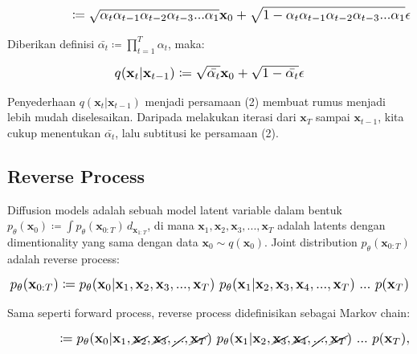 \documentclass{article}
\newcommand*{\Scale}[2][4]{\scalebox{#1}{\ensuremath{#2}}}
\begin{document}
\begin{equation}
\Scale[1.2]{ \displaystyle
\hspace{4.75em} \coloneq \sqrt{\alpha_t \alpha_{t-1} \alpha_{t-2} \alpha_{t-3} ... \alpha_{1}} \textbf{x}_{0} + \sqrt{1-\alpha_t\alpha_{t-1}\alpha_{t-2}\alpha_{t-3}...\alpha_{1}} \epsilon }
\end{equation}

Diberikan definisi $ \bar{\alpha_t} \coloneq \displaystyle \prod_{t=1}^{T} \alpha_t $, maka:

\begin{equation}
\Scale[1.2]{ \displaystyle
q(\textbf{x}_{t}|\textbf{x}_{t-1}) \coloneq \sqrt{\bar{\alpha_t}} \textbf{x}_{0} + \sqrt{1-\bar{\alpha_t}} \epsilon }
\end{equation}

Penyederhaan $ q(\textbf{x}_{t}|\textbf{x}_{t-1}) $ menjadi persamaan (2) membuat rumus menjadi lebih mudah diselesaikan. Daripada melakukan iterasi dari $ \textbf{x}_{T} $ sampai $ \textbf{x}_{t-1} $, kita cukup menentukan $ \bar{\alpha_t} $, lalu subtitusi ke persamaan (2).


\subsection{Reverse Process}


Diffusion models adalah sebuah model latent variable dalam bentuk $ p_\theta(\textbf{x}_0) \coloneq \int p_\theta(\textbf{x}_{0:T}) \,d_{\textbf{x}_{1:T}} $, di mana $ \textbf{x}_1,\textbf{x}_2,\textbf{x}_3,...,\textbf{x}_T $ adalah latents dengan dimentionality yang sama dengan data $ \textbf{x}_0 \sim q(\textbf{x}_0) $. Joint distribution $ p_\theta(\textbf{x}_{0:T}) $ adalah reverse process:

\begin{equation}
\Scale[1.2]{ \displaystyle
p_\theta(\textbf{x}_{0:T}) \coloneq p_\theta(\textbf{x}_0|\textbf{x}_1,\textbf{x}_2,\textbf{x}_3,...,\textbf{x}_T) \ p_\theta(\textbf{x}_1|\textbf{x}_2,\textbf{x}_3,\textbf{x}_4,...,\textbf{x}_T) \ ... \  p(\textbf{x}_{T}) }
\end{equation}

Sama seperti forward process, reverse process didefinisikan sebagai Markov chain:

\begin{equation}
\Scale[1.2]{ \displaystyle
\hspace{3.75em} \coloneq p_\theta(\textbf{x}_0|\textbf{x}_1,\cancel{\textbf{x}_2},\cancel{\textbf{x}_3},\cancel{...},\cancel{\textbf{x}_T}) \ p_\theta(\textbf{x}_1|\textbf{x}_2,\cancel{\textbf{x}_3},\cancel{\textbf{x}_4},\cancel{...},\cancel{\textbf{x}_T}) \ ... \  p(\textbf{x}_{T}), }
\end{equation}
\end{document}

